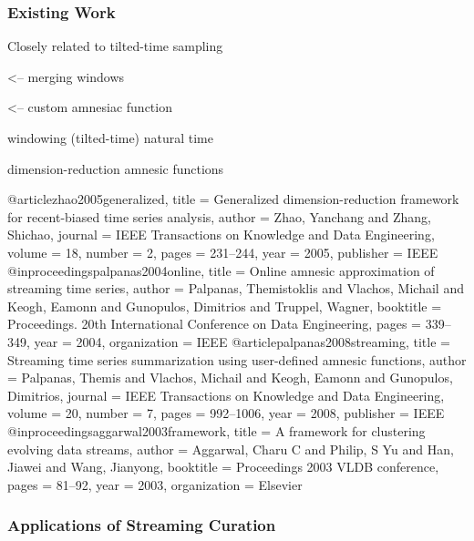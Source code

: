 \subsubsection{Existing Work}



Closely related to tilted-time sampling \citep{giannella2003mining,han2005stream}

\citep{zhao2005generalized} <-- merging windows

\citep{palpanas2004online} <-- custom amnesiac function

windowing (tilted-time) natural time \citep{giannella2003mining}

dimension-reduction \citep{zhao2005generalized}
amnesic functions \citep{palpanas2008streaming}


@article{zhao2005generalized,
  title     = {Generalized dimension-reduction framework for recent-biased time series analysis},
  author    = {Zhao, Yanchang and Zhang, Shichao},
  journal   = {IEEE Transactions on Knowledge and Data Engineering},
  volume    = {18},
  number    = {2},
  pages     = {231--244},
  year      = {2005},
  publisher = {IEEE}
}
@inproceedings{palpanas2004online,
  title        = {Online amnesic approximation of streaming time series},
  author       = {Palpanas, Themistoklis and Vlachos, Michail and Keogh, Eamonn and Gunopulos, Dimitrios and Truppel, Wagner},
  booktitle    = {Proceedings. 20th International Conference on Data Engineering},
  pages        = {339--349},
  year         = {2004},
  organization = {IEEE}
}
@article{palpanas2008streaming,
  title     = {Streaming time series summarization using user-defined amnesic functions},
  author    = {Palpanas, Themis and Vlachos, Michail and Keogh, Eamonn and Gunopulos, Dimitrios},
  journal   = {IEEE Transactions on Knowledge and Data Engineering},
  volume    = {20},
  number    = {7},
  pages     = {992--1006},
  year      = {2008},
  publisher = {IEEE}
}
@inproceedings{aggarwal2003framework,
  title        = {A framework for clustering evolving data streams},
  author       = {Aggarwal, Charu C and Philip, S Yu and Han, Jiawei and Wang, Jianyong},
  booktitle    = {Proceedings 2003 VLDB conference},
  pages        = {81--92},
  year         = {2003},
  organization = {Elsevier}
}


\subsubsection{Applications of Streaming Curation}

